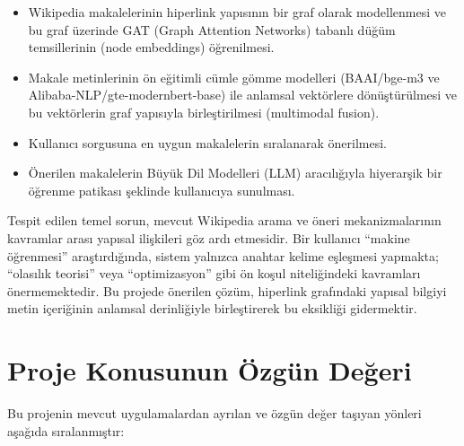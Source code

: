\documentclass[12pt, a4paper]{article}
\begin{document}
\begin{itemize}
    \item Wikipedia makalelerinin hiperlink yapısının bir graf olarak modellenmesi ve bu graf üzerinde GAT (Graph Attention Networks) tabanlı düğüm temsillerinin (node embeddings) öğrenilmesi.
    \item Makale metinlerinin ön eğitimli cümle gömme modelleri (BAAI/bge-m3 ve Alibaba-NLP/gte-modernbert-base) ile anlamsal vektörlere dönüştürülmesi ve bu vektörlerin graf yapısıyla birleştirilmesi (multimodal fusion).
    \item Kullanıcı sorgusuna en uygun makalelerin sıralanarak önerilmesi.
    \item Önerilen makalelerin Büyük Dil Modelleri (LLM) aracılığıyla hiyerarşik bir öğrenme patikası şeklinde kullanıcıya sunulması.
\end{itemize}

Tespit edilen temel sorun, mevcut Wikipedia arama ve öneri mekanizmalarının kavramlar arası yapısal ilişkileri göz ardı etmesidir. Bir kullanıcı ``makine öğrenmesi'' araştırdığında, sistem yalnızca anahtar kelime eşleşmesi yapmakta; ``olasılık teorisi'' veya ``optimizasyon'' gibi ön koşul niteliğindeki kavramları önermemektedir. Bu projede önerilen çözüm, hiperlink grafındaki yapısal bilgiyi metin içeriğinin anlamsal derinliğiyle birleştirerek bu eksikliği gidermektir.

\section{Proje Konusunun Özgün Değeri}

Bu projenin mevcut uygulamalardan ayrılan ve özgün değer taşıyan yönleri aşağıda sıralanmıştır:
\end{document}
